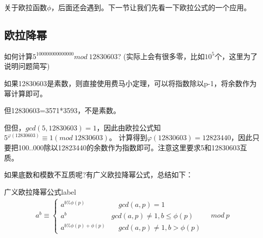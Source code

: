 关于欧拉函数$\phi$，后面还会遇到。下一节让我们先看一下欧拉公式的一个应用。

\subsection{欧拉降幂}
如何计算$5^{100000000000000}mod\ 12830603$? (实际上会有很多零，比如$10^5$个，这里为了说明问题简写)

如果12830603是素数，则直接使用费马小定理，可以将指数除以p-1，将余数作为幂计算即可。

但12830603=3571*3593，不是素数。

但但，$gcd(5,12830603)=1$，因此由欧拉公式知$5^{\varphi(12830603)}\equiv 1 (mod \ 12830603)$。
计算得到$\varphi(12830603)=12823440$，因此只要把100..000除以12823440的余数作为指数即可。{\heiti 注意这里要求5和12830603互质}。

{\heiti 如果底数和模数不互质呢?有广义欧拉降幂公式}，总结如下：

\begin{theorem}{广义欧拉降幂公式}{label}
	\begin{align*}
	a^b\equiv  \left\{\begin{matrix}
	a^{b\% \phi(p)}&  \quad gcd(a,p)=1 \\
	a^b   \quad  & gcd(a,p)\neq 1,b\le \phi(p) \\
	a^{b\% \phi(p)+\phi(p)} &\quad   gcd(a,p)\neq 1,b>\phi(p)
	\end{matrix}\right. \quad {mod \ p}
	\end{align*}
\end{theorem}


